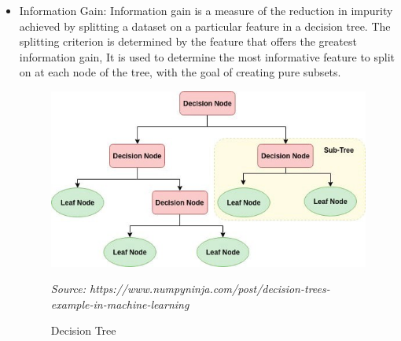 \begin{itemize}
\item Information Gain: Information gain is a measure of the reduction in impurity achieved by splitting a dataset on a particular feature in a decision tree. The splitting criterion is determined by the feature that offers the greatest information gain, It is used to determine the most informative feature to split on at each node of the tree, with the goal of creating pure subsets.
\begin{figure}[h]
\centering
\includegraphics[scale=0.5]{decision_tree.png}
\caption{Decision Tree}
\textit{Source: https://www.numpyninja.com/post/decision-trees-example-in-machine-learning
}
\end{figure} 


\end{itemize}
